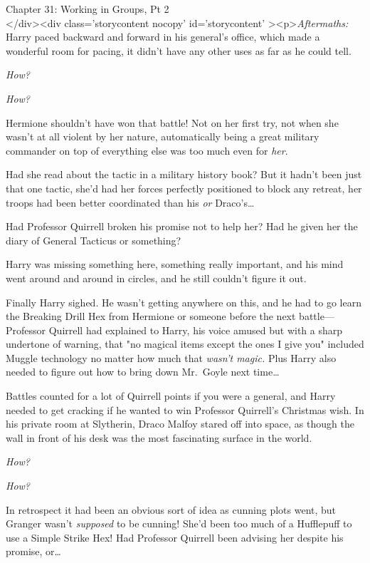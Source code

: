
Chapter 31: Working in Groups, Pt 2\\
</div><div  class='storycontent nocopy' id='storycontent' ><p>\emph{Aftermaths:}
\sbreak
Harry paced backward and forward in his general's office, which made a 
wonderful room for pacing, it didn't have any other uses as far as he could 
tell.

\emph{How?}

\emph{How?}

Hermione shouldn't have won that battle! Not on her first try, not when she 
wasn't at all violent by her nature, automatically being a great military 
commander on top of everything else was too much even for \emph{her}.

Had she read about the tactic in a military history book? But it hadn't been 
just that one tactic, she'd had her forces perfectly positioned to block any 
retreat, her troops had been better coordinated than his \emph{or} 
Draco's{\ldots}

Had Professor Quirrell broken his promise not to help her? Had he given her the 
diary of General Tacticus or something?

Harry was missing something here, something really important, and his mind went 
around and around in circles, and he still couldn't figure it out.

Finally Harry sighed. He wasn't getting anywhere on this, and he had to go 
learn the Breaking Drill Hex from Hermione or someone before the next 
battle---Professor Quirrell had explained to Harry, his voice amused but with a 
sharp undertone of warning, that "no magical items except the ones I give you" 
included Muggle technology no matter how much that \emph{wasn't magic.} Plus 
Harry also needed to figure out how to bring down Mr.~Goyle next time{\ldots}

Battles counted for a lot of Quirrell points if you were a general, and Harry 
needed to get cracking if he wanted to win Professor Quirrell's Christmas wish.
\sbreak
In his private room at Slytherin, Draco Malfoy stared off into space, as though 
the wall in front of his desk was the most fascinating surface in the world.

\emph{How?}

\emph{How?}

In retrospect it had been an obvious sort of idea as cunning plots went, but 
Granger wasn't \emph{supposed} to be cunning! She'd been too much of a 
Hufflepuff to use a Simple Strike Hex! Had Professor Quirrell been advising her 
despite his promise, or{\ldots}

